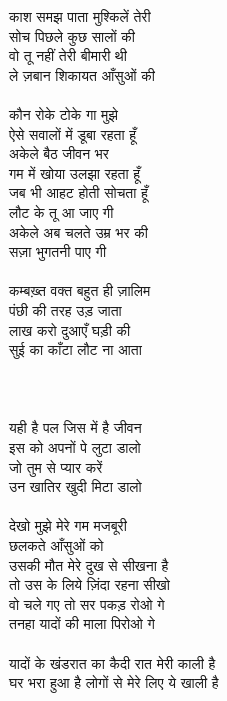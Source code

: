 {{{{{{{{{{{{{{{{{{{{{{{{{{{{{{{{{{{{{{{{{{{{{{{{{{{{{{{{{{{काश समझ पाता मुश्किलें तेरी\\
सोच पिछले कुछ सालों की\\
वो तू नहीं तेरी बीमारी थी\\
ले ज़बान शिकायत आँसुओं की\\
\\
कौन रोके टोके गा मुझे\\
ऐसे सवालों में डूबा रहता हूँ\\
अकेले बैठ जीवन भर\\
गम में खोया उलझा रहता हूँ\\
जब भी आहट होती सोचता हूँ\\
लौट के तू आ जाए गी\\
अकेले अब चलते उम्र भर की\\
सज़ा भुगतनी पाए गी\\
\\
कम्बख़्त वक्त बहुत ही ज़ालिम\\
पंछी की तरह उड़ जाता\\
लाख करो दुआएँ घड़ी की\\
सुई का काँटा लौट ना आता\\
\\
\\
\\
यही है पल जिस में है जीवन\\
इस को अपनों पे लुटा डालो\\
जो तुम से प्यार करें\\
उन खातिर खुदी मिटा डालो\\
\\
देखो मुझे मेरे गम मजबूरी\\
छलकते आँसुओं को\\
उसकी मौत मेरे दुख से सीखना है\\
तो उस के लिये ज़िंदा रहना सीखो\\
वो चले गए तो सर पकड़ रोओ गे\\
तनहा यादों की माला पिरोओ गे\\
\\
यादों के खंडरात का कैदी रात मेरी काली है\\
घर भरा हुआ है लोगों से मेरे लिए ये खाली है\\
\\
\\
\\
\\
\\
\\
}}}}}}}}}}}}}}}}}}}}}}}}}}}}}}}}}}}}}}}}}}}}}}}}}}}}}}}}}}}
